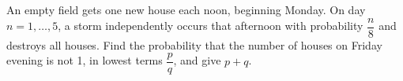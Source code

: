An empty field gets one new house each noon, beginning Monday. On day $n=1,\ldots,5$, a storm independently occurs that afternoon with probability $\dfrac{n}{8}$ and destroys all houses. Find the probability that the number of houses on Friday evening is not 1, in lowest terms $\dfrac{p}{q}$, and give $p+q$.
